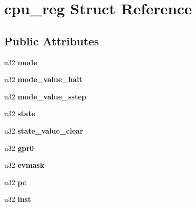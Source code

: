 \hypertarget{structcpu__reg}{
\section{cpu\_\-reg Struct Reference}
\label{structcpu__reg}
}
\subsection*{Public Attributes}
\begin{DoxyCompactItemize}
\item 
\hypertarget{structcpu__reg_a2a1fe88628ac6ecf94c1f511a51ab4a3}{
u32 {\bfseries mode}}
\label{structcpu__reg_a2a1fe88628ac6ecf94c1f511a51ab4a3}

\item 
\hypertarget{structcpu__reg_a024147b6986ed497d38740dcf9e3b9e9}{
u32 {\bfseries mode\_\-value\_\-halt}}
\label{structcpu__reg_a024147b6986ed497d38740dcf9e3b9e9}

\item 
\hypertarget{structcpu__reg_ad163acc668209e46528ad4d7edfbac1d}{
u32 {\bfseries mode\_\-value\_\-sstep}}
\label{structcpu__reg_ad163acc668209e46528ad4d7edfbac1d}

\item 
\hypertarget{structcpu__reg_ac9b8bff0b14423e4f04f9151feaf227a}{
u32 {\bfseries state}}
\label{structcpu__reg_ac9b8bff0b14423e4f04f9151feaf227a}

\item 
\hypertarget{structcpu__reg_aeb0b7a746184a2f2a47e7ea6b1687729}{
u32 {\bfseries state\_\-value\_\-clear}}
\label{structcpu__reg_aeb0b7a746184a2f2a47e7ea6b1687729}

\item 
\hypertarget{structcpu__reg_ae0f10ab3598a9502dae21713928c831c}{
u32 {\bfseries gpr0}}
\label{structcpu__reg_ae0f10ab3598a9502dae21713928c831c}

\item 
\hypertarget{structcpu__reg_aea0d9ca3dd68f7f010056f5b378bee64}{
u32 {\bfseries evmask}}
\label{structcpu__reg_aea0d9ca3dd68f7f010056f5b378bee64}

\item 
\hypertarget{structcpu__reg_a4118e6d3dd2230ad88afb1effe4f6aaa}{
u32 {\bfseries pc}}
\label{structcpu__reg_a4118e6d3dd2230ad88afb1effe4f6aaa}

\item 
\hypertarget{structcpu__reg_a9ef65faa7c3edfb22044d1db005eceeb}{
u32 {\bfseries inst}}
\label{structcpu__reg_a9ef65faa7c3edfb22044d1db005eceeb}


\end{DoxyCompactItemize}
